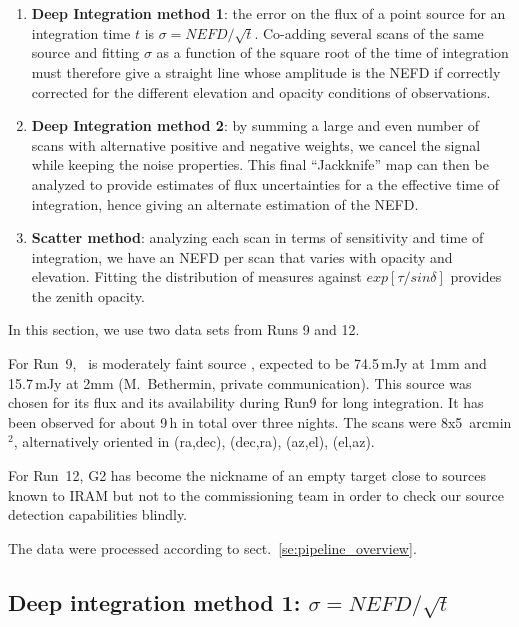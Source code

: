 \begin{enumerate}
\item {\bf Deep Integration method 1}: the error on the flux of a point source for an
  integration time $t$ is $\sigma = NEFD/\sqrt{t}$. Co-adding several scans of
  the same source and fitting $\sigma$ as a function of the square root of the
  time of integration must therefore give a straight line whose
  amplitude is the NEFD if correctly corrected for the different elevation and
  opacity conditions of observations.
\item {\bf Deep Integration method 2}: by summing a large and even number of scans
  with alternative positive and negative weights, we cancel the signal while
  keeping the noise properties. This final ``Jackknife'' map can then be analyzed
  to provide estimates of flux uncertainties for a the effective time of
  integration, hence giving an alternate estimation of the NEFD.
\item {\bf Scatter method}: analyzing each scan in terms of sensitivity and
  time of integration, we have an NEFD per scan that varies with opacity and
  elevation. Fitting the distribution of measures against $exp[\tau/sin\delta]$
  provides the zenith opacity.
\end{enumerate}

In this section, we use two data sets from Runs 9 and 12.

For Run~9, \hls\ is moderately faint source \cite{hls_combes}, expected to be
74.5\,mJy at 1mm and 15.7\,mJy at 2mm (M.~Bethermin, private
communication). This source was chosen for its flux and its availability during
Run9 for long integration. It has been observed for about 9\,h in total over
three nights. The scans were 8x5~arcmin$^2$, alternatively oriented in (ra,dec),
(dec,ra), (az,el), (el,az).

For Run~12, G2 has become the nickname of an empty target close to sources known
to IRAM but not to the commissioning team in order to check our source
detection capabilities blindly.

The data were processed according to sect.~\ref{se:pipeline_overview}.

\subsection{Deep integration method 1: $\sigma = NEFD/\sqrt{t}$}
\label{se:nefd_m1}


